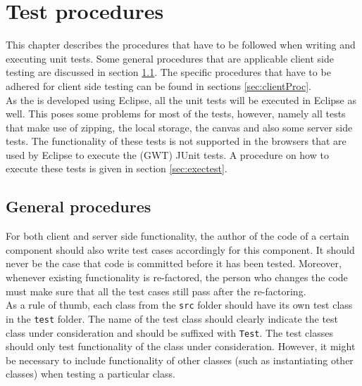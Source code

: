 \chapter{Test procedures}\label{chap:testProc}
This chapter describes the procedures that have to be followed when writing and executing unit tests. Some general procedures that are applicable client side testing are discussed in section \ref{sec:genProc}. The specific procedures that have to be adhered for client side testing can be found in sections \ref{sec:clientProc}. \\
As the \applicationname{} is developed using Eclipse, all the unit tests will be executed in Eclipse as well. This poses some problems for most of the tests, however, namely all tests that make use of zipping, the local storage, the canvas and also some server side tests. The functionality of these tests is not supported in the browsers that are used by Eclipse to execute the (GWT) JUnit tests. A procedure on how to execute these tests is given in section \ref{sec:exectest}.

\section{General procedures}\label{sec:genProc}
For both client and server side functionality, the author of the code of a certain component should also write test cases accordingly for this component. It should never be the case that code is committed before it has been tested. Moreover, whenever existing functionality is re-factored, the person who changes the code must make sure that all the test cases still pass after the re-factoring. \\
As a rule of thumb, each class from the \texttt{src} folder should have its own test class in the \texttt{test} folder. The name of the test class should clearly indicate the test class under consideration and should be suffixed with \texttt{Test}. The test classes should only test functionality of the class under consideration. However, it might be necessary to include functionality of other classes (such as instantiating other classes) when testing a particular class.

